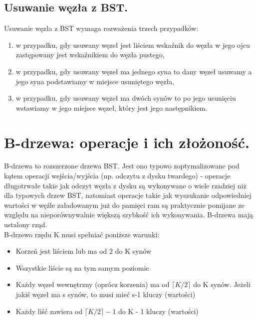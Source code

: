 \documentclass[12pt]{article}
\begin{document}
    \subsection{Usuwanie węzła z BST.}

    \begin{theorem}
        Usuwanie węzła z BST wymaga rozważenia trzech przypadków:
        \begin{enumerate}
            \item w przypadku, gdy usuwany węzeł jest liściem wskaźnik do węzła w jego ojcu zastępowany jest wskaźnikiem do węzła pustego,
            \item w przypadku, gdy usuwany węzeł ma jednego syna to dany węzeł usuwamy a jego syna podstawiamy w miejsce usuniętego węzła,
            \item w przypadku, gdy usuwany węzeł ma dwóch synów to po jego usunięciu wstawiamy w jego miejsce węzeł, który jest jego następnikiem.
        \end{enumerate}
    \end{theorem}

    \newpage

    \section{B-drzewa: operacje i ich złożoność.}
    B-drzewa to rozszerzone drzewa BST.
    Jest ono typowo zoptymalizowane pod kątem operacji wejścia/wyjścia (np. odczytu z dysku twardego) - operacje długotrwałe takie jak odczyt węzła z dysku są wykonywane o wiele rzadziej niż dla typowych drzew BST, natomiast operacje takie jak wyszukanie odpowiedniej wartości w węźle załadowanym już do pamięci ram są praktycznie pomijane ze względu na nieporównywalnie większą szybkość ich wykonywania.
    B-drzewa mają ustalony rząd. \\
    \noindent B-drzewo rzędu K musi spełniać poniższe warunki:
    \begin{itemize}
        \item Korzeń jest liściem lub ma od 2 do K synów
        \item Wszystkie liście są na tym samym poziomie
        \item Każdy węzeł wewnętrzny (oprócz korzenia) ma od $\lceil K/2 \rceil$ do K synów. Jeżeli jakiś węzeł ma s synów, to musi mieć s-1 kluczy (wartości)
        \item Każdy liść zawiera od $\lceil K/2 \rceil - 1$ do K - 1 kluczy (wartości)
    \end{itemize}
\end{document}
